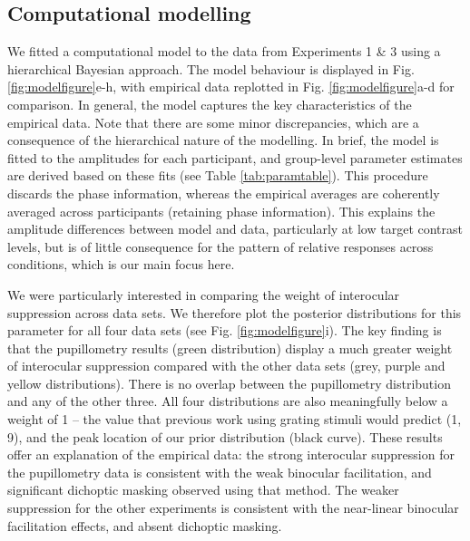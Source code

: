 \documentclass[
]{article}
\begin{document}
\hypertarget{computational-modelling}{%
\subsection{Computational modelling}\label{computational-modelling}}

We fitted a computational model to the data from Experiments 1 \& 3 using a hierarchical Bayesian approach. The model behaviour is displayed in Fig. \ref{fig:modelfigure}e-h, with empirical data replotted in Fig. \ref{fig:modelfigure}a-d for comparison. In general, the model captures the key characteristics of the empirical data. Note that there are some minor discrepancies, which are a consequence of the hierarchical nature of the modelling. In brief, the model is fitted to the amplitudes for each participant, and group-level parameter estimates are derived based on these fits (see Table \ref{tab:paramtable}). This procedure discards the phase information, whereas the empirical averages are coherently averaged across participants (retaining phase information). This explains the amplitude differences between model and data, particularly at low target contrast levels, but is of little consequence for the pattern of relative responses across conditions, which is our main focus here.

We were particularly interested in comparing the weight of interocular suppression across data sets. We therefore plot the posterior distributions for this parameter for all four data sets (see Fig. \ref{fig:modelfigure}i). The key finding is that the pupillometry results (green distribution) display a much greater weight of interocular suppression compared with the other data sets (grey, purple and yellow distributions). There is no overlap between the pupillometry distribution and any of the other three. All four distributions are also meaningfully below a weight of 1 -- the value that previous work using grating stimuli would predict (1, 9), and the peak location of our prior distribution (black curve). These results offer an explanation of the empirical data: the strong interocular suppression for the pupillometry data is consistent with the weak binocular facilitation, and significant dichoptic masking observed using that method. The weaker suppression for the other experiments is consistent with the near-linear binocular facilitation effects, and absent dichoptic masking.
\end{document}
